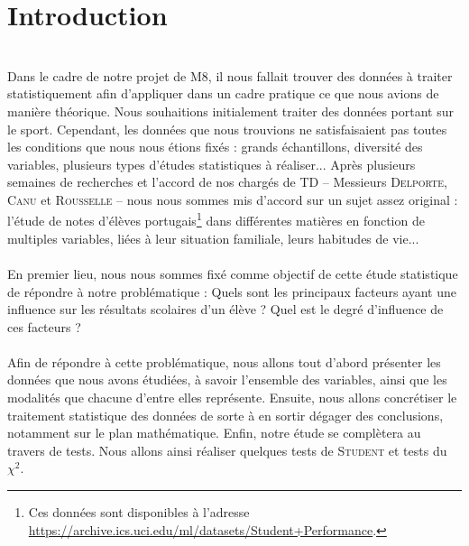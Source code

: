 \documentclass[11pt]{article}
\begin{document}
\section*{Introduction}\thispagestyle{mine}
{\large ~\\

 Dans le cadre de notre projet de M8, il nous fallait trouver des données à traiter statistiquement afin d'appliquer dans un cadre pratique ce que nous avions de manière théorique. Nous souhaitions initialement traiter des données portant sur le sport. Cependant, les données que nous trouvions ne satisfaisaient pas toutes les conditions que nous nous étions fixés : grands échantillons, diversité des variables, plusieurs types d'études statistiques à réaliser... Après plusieurs semaines de recherches et l'accord de nos chargés de TD \--- Messieurs \textsc{Delporte}, \textsc{Canu} et \textsc{Rousselle} \--- nous nous sommes mis d'accord sur un sujet assez original : l'étude de notes d'élèves portugais\footnote{Ces données sont disponibles à l'adresse \url{https://archive.ics.uci.edu/ml/datasets/Student+Performance}.} dans différentes matières en fonction de multiples variables, liées à leur situation familiale, leurs habitudes de vie... ~\\\\

En premier lieu, nous nous sommes fixé comme objectif de cette étude statistique de répondre à notre problématique : Quels sont les principaux facteurs ayant une influence sur les résultats scolaires d’un élève ? Quel est le degré d’influence de ces facteurs ?~\\\\

Afin de répondre à cette problématique, nous allons tout d'abord présenter les données que nous avons étudiées, à savoir l'ensemble des variables, ainsi que les modalités que chacune d'entre elles représente. Ensuite, nous allons concrétiser le traitement statistique des données de sorte à en sortir dégager des conclusions, notamment sur le plan mathématique. Enfin, notre étude se complètera au travers de tests. Nous allons ainsi réaliser quelques tests de \textsc{Student} et tests du $\chi^2$. 
}





\newpage
\renewcommand*\lstlistingname{Code}
\renewcommand*{\lstlistlistingname}{Liste des codes}

\let\oldtabular=\tabular
\def\tabular{\scriptsize\oldtabular}
\end{document}
